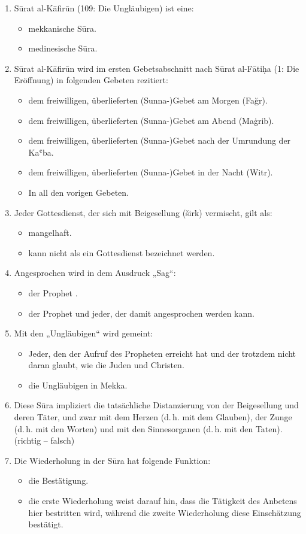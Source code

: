 \begin{enumerate}[leftmargin=1.6em,resume]
\item Sūrat al-Kāfirūn (109: Die Ungläubigen) ist eine:
  \begin{itemize}
    \item mekkanische Sūra. \item medinesische Sūra.
  \end{itemize}
\item Sūrat al-Kāfirūn wird im ersten Gebetsabschnitt nach Sūrat al-Fātiḥa (1: Die Eröffnung) in
  folgenden Gebeten rezitiert:
  \begin{itemize}
    \item dem freiwilligen, überlieferten (Sunna-)Gebet am Morgen (Fağr).
    \item dem freiwilligen, überlieferten (Sunna-)Gebet am Abend (Maġrib).
    \item dem freiwilligen, überlieferten (Sunna-)Gebet nach der Umrundung der Kaʿba.
    \item dem freiwilligen, überlieferten (Sunna-)Gebet in der Nacht (Witr).
    \item In all den vorigen Gebeten.
  \end{itemize}
\item Jeder Gottesdienst, der sich mit Beigesellung (širk) vermischt, gilt als:
  \begin{itemize}
    \item mangelhaft. \item kann nicht als ein Gottesdienst bezeichnet werden.
  \end{itemize}
\item Angesprochen wird in dem Ausdruck „Sag“:
  \begin{itemize}
    \item der Prophet .
    \item der Prophet  und jeder, der damit angesprochen werden kann.
  \end{itemize}
\item Mit den „Ungläubigen“ wird gemeint:
  \begin{itemize}
    \item Jeder, den der Aufruf des Propheten  erreicht hat und der trotzdem nicht daran
      glaubt, wie die Juden und Christen.
    \item die Ungläubigen in Mekka.
  \end{itemize}
\item Diese Sūra impliziert die tatsächliche Distanzierung von der Beigesellung und deren
  Täter, und zwar mit dem Herzen (d.\,h. mit dem Glauben), der Zunge (d.\,h. mit den Worten)
  und mit den Sinnesorganen (d.\,h. mit den Taten). (richtig -- falsch)
\item Die Wiederholung in der Sūra hat folgende Funktion:
  \begin{itemize}
    \item die Bestätigung.
    \item die erste Wiederholung weist darauf hin, dass die Tätigkeit des Anbetens hier
      bestritten wird, während die zweite Wiederholung diese Einschätzung bestätigt.
  \end{itemize}
\end{enumerate}

